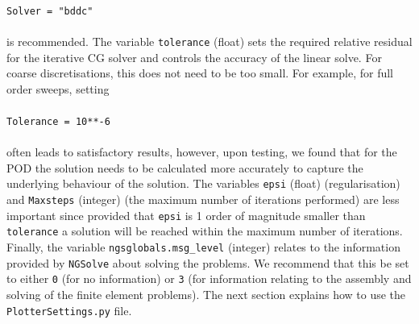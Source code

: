 \\
\texttt{Solver = "bddc"}\\
\\
is recommended. The variable \texttt{tolerance} (float) sets the required relative residual for the iterative CG solver and controls the accuracy of the linear solve. For coarse discretisations, this does not need to be too small. For example, for  full order sweeps, setting\\
\\
\texttt{Tolerance = 10**-6}\\
\\
often leads to satisfactory results, however, upon testing, we found that for the POD the solution needs to be calculated more accurately to capture the underlying behaviour of the solution. The variables \texttt{epsi} (float) (regularisation) and \texttt{Maxsteps} (integer) (the maximum number of iterations performed) are less important since provided that \texttt{epsi} is 1 order of magnitude smaller than \texttt{tolerance} a solution will be reached within the maximum number of iterations. Finally, the variable \texttt{ngsglobals.msg\_level} (integer) relates to the information provided by \texttt{NGSolve} about solving the problems. We recommend that this be set to either \texttt{0} (for no information) or \texttt{3} (for information relating to the assembly and solving of the finite element problems). The next section explains how to use the \texttt{PlotterSettings.py} file.\\
\\
